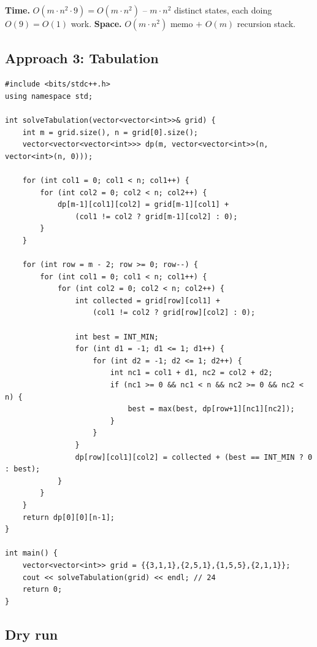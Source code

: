 \begin{complexitybox}
\textbf{Time.} $O(m \cdot n^2 \cdot 9)= O(m \cdot n^2)$ -- $m \cdot n^2$
distinct states, each doing $O(9)=O(1)$ work.
\textbf{Space.} $O(m \cdot n^2)$ memo $+$ $O(m)$ recursion stack.
\end{complexitybox}

\subsection*{Approach 3: Tabulation}

\begin{lstlisting}
#include <bits/stdc++.h>
using namespace std;

int solveTabulation(vector<vector<int>>& grid) {
    int m = grid.size(), n = grid[0].size();
    vector<vector<vector<int>>> dp(m, vector<vector<int>>(n, vector<int>(n, 0)));

    for (int col1 = 0; col1 < n; col1++) {
        for (int col2 = 0; col2 < n; col2++) {
            dp[m-1][col1][col2] = grid[m-1][col1] +
                (col1 != col2 ? grid[m-1][col2] : 0);
        }
    }

    for (int row = m - 2; row >= 0; row--) {
        for (int col1 = 0; col1 < n; col1++) {
            for (int col2 = 0; col2 < n; col2++) {
                int collected = grid[row][col1] +
                    (col1 != col2 ? grid[row][col2] : 0);

                int best = INT_MIN;
                for (int d1 = -1; d1 <= 1; d1++) {
                    for (int d2 = -1; d2 <= 1; d2++) {
                        int nc1 = col1 + d1, nc2 = col2 + d2;
                        if (nc1 >= 0 && nc1 < n && nc2 >= 0 && nc2 < n) {
                            best = max(best, dp[row+1][nc1][nc2]);
                        }
                    }
                }
                dp[row][col1][col2] = collected + (best == INT_MIN ? 0 : best);
            }
        }
    }
    return dp[0][0][n-1];
}

int main() {
    vector<vector<int>> grid = {{3,1,1},{2,5,1},{1,5,5},{2,1,1}};
    cout << solveTabulation(grid) << endl; // 24
    return 0;
}
\end{lstlisting}

\subsection*{Dry run}


